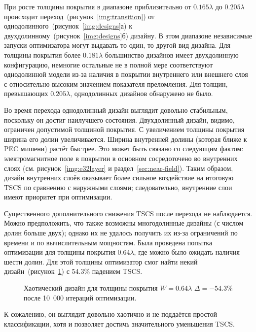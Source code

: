 При росте толщины покрытия в диапазоне приблизительно от
${0.165\lambda}$ до ${0.205\lambda}$ происходит
переход~(рисунок~\ref{img:transition}) от
однодолинного~(рисунок~\ref{img:designs}а) к
двухдолинному~(рисунок~\ref{img:designs}б) дизайну. В этом диапазоне
независимые запуски оптимизатора могут выдавать то один, то другой вид
дизайна.  Для толщины покрытия более ${0.181\lambda}$ большинство
дизайнов имеет двухдолинную конфигурацию, немногие остальные не в
полной мере соответствуют однодолинной модели из-за наличия в покрытии
внутреннего или внешнего слоя с относительно высоким значением
показателя преломления. Для толщин, превышающих ${0.205\lambda}$,
однодолинных дизайнов обнаружено не было.

Во время перехода однодолинный дизайн выглядит довольно стабильным,
поскольку он достиг наилучшего состояния. Двухдолинный дизайн, видимо,
ограничен допустимой толщиной покрытия. С увеличением толщины покрытия
ширина его долин увеличивается. Ширина внутренней долины (которая
ближе к PEC мишени) растёт быстрее. Это может быть связано со
следующим фактом: электромагнитное поле в покрытии в основном
сосредоточено во внутренних слоях (см. рисунок~\ref{img:e32layer} и
раздел~\ref{sec:near-field}). Таким образом, дизайн внутренних слоёв
оказывает более сильное воздействие на итоговую TSCS по сравнению с
наружными слоями; следовательно, внутренние слои имеют приоритет при
оптимизации.

Существенного дополнительного снижения TSCS после перехода не
наблюдается. Можно предположить, что также возможны многодолинные
дизайны (с числом долин больше двух); однако их не удалось получить их
из-за ограничений по времени и по вычислительным мощностям. Была
проведена попытка оптимизации для толщины покрытия $0.64\lambda$, где
можно было ожидать наличия шести долин. Для этой толщины оптимизатор
смог найти некий дизайн~(рисунок~\ref{fig:thick}) с 54.3\% падением
TSCS.
\begin{figure}
  \caption{Хаотический дизайн для толщины покрытия $W=0.64\lambda$
    $\Delta =-54.3$\% после 10~000 итераций оптимизации.
    \label{fig:thick}}%
\end{figure}
К сожалению, он выглядит довольно хаотично и не поддаётся простой
классификации, хотя и позволяет достичь значительного уменьшения
TSCS.

